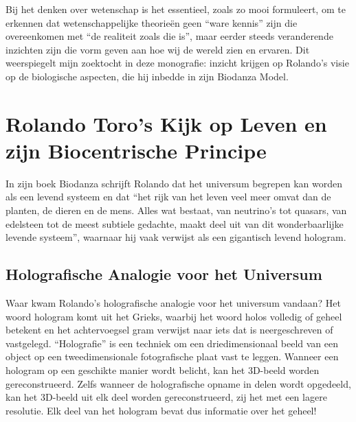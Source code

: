 \documentclass[
  11pt,
]{book}
\begin{document}
Bij het denken over wetenschap is het essentieel, zoals \citet{bohm1980} zo mooi formuleert, om te erkennen dat wetenschappelijke theorieën geen ``ware kennis'' zijn die overeenkomen met ``de realiteit zoals die is'', maar eerder steeds veranderende inzichten zijn die vorm geven aan hoe wij de wereld zien en ervaren. Dit weerspiegelt mijn zoektocht in deze monografie: inzicht krijgen op Rolando's visie op de biologische aspecten, die hij inbedde in zijn Biodanza Model.

\hypertarget{rolando-toros-kijk-op-leven-en-zijn-biocentrische-principe}{%
\section{Rolando Toro's Kijk op Leven en zijn Biocentrische Principe}\label{rolando-toros-kijk-op-leven-en-zijn-biocentrische-principe}}

In zijn boek Biodanza schrijft Rolando dat het universum begrepen kan worden als een levend systeem en dat ``het rijk van het leven veel meer omvat dan de planten, de dieren en de mens. Alles wat bestaat, van neutrino's tot quasars, van edelsteen tot de meest subtiele gedachte, maakt deel uit van dit wonderbaarlijke levende systeem'', waarnaar hij vaak verwijst als een gigantisch levend hologram.

\hypertarget{holografische-analogie-voor-het-universum}{%
\subsection{Holografische Analogie voor het Universum}\label{holografische-analogie-voor-het-universum}}

Waar kwam Rolando's holografische analogie voor het universum vandaan? Het woord hologram komt uit het Grieks, waarbij het woord holos volledig of geheel betekent en het achtervoegsel gram verwijst naar iets dat is neergeschreven of vastgelegd. ``Holografie'' is een techniek om een driedimensionaal beeld van een object op een tweedimensionale fotografische plaat vast te leggen. Wanneer een hologram op een geschikte manier wordt belicht, kan het 3D-beeld worden gereconstrueerd. Zelfs wanneer de holografische opname in delen wordt opgedeeld, kan het 3D-beeld uit elk deel worden gereconstrueerd, zij het met een lagere resolutie. Elk deel van het hologram bevat dus informatie over het geheel!
\end{document}
